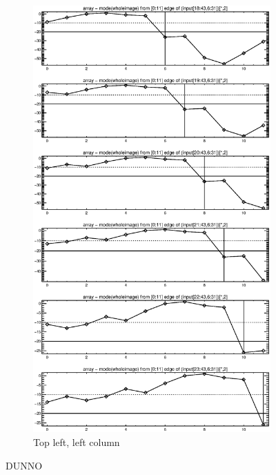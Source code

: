 \documentclass[10pt]{article}
\begin{document}
\begin{figure}[!h]
\begin{subfigure}[b]{.4\linewidth}
        \centering
        \includegraphics[width=1.4\textwidth]{../plots_tables_images/topright1.eps} 
        \caption{Top left, left column}
    \end{subfigure}
    \caption{DUNNO}
\end{figure}
\end{document}
